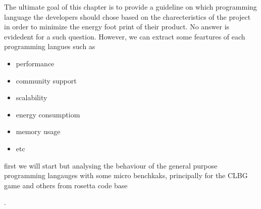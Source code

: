 The ultimate goal of this chapter is to provide a guideline on which programming language the developers should chose based on the charecteristics of the project in order to minimize the energy foot print of their product.
No answer is evidedent for a such question. However, we can extract some feartures of each programming langues such as
\begin{itemize}
    \item performance
    \item community support
    \item scalability
    \item energy consumptiom
    \item memory usage
    \item etc
\end{itemize}

first we will start but analysing the behaviour of the general purpose programming langauges with some micro benchkaks, principally for the CLBG game and others from rosetta code base

.